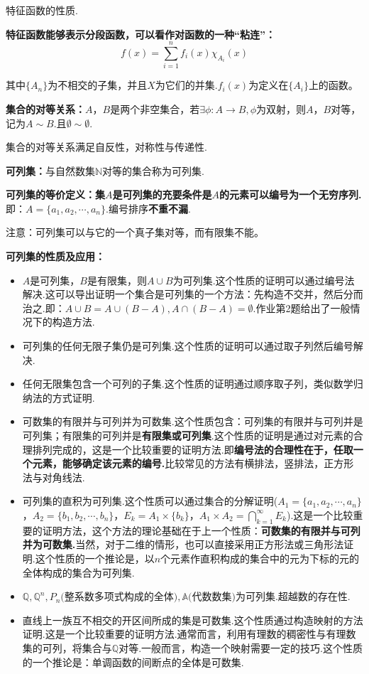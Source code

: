 \documentclass[bwprint, withoutpreface]{cumcmthesis}
\begin{document}
特征函数的性质.

\textbf{特征函数能够表示分段函数，可以看作对函数的一种“粘连”：}
\begin{equation*}
	f(x) = \sum_{i = 1}^{n}{f_i(x)\chi_{A_i}(x)}
\end{equation*}

其中$\{A_n\}$为不相交的子集，并且$X$为它们的并集.$f_i(x)$为定义在$\{A_i\}$上的函数。

\textbf{集合的对等关系：}$A$，$B$是两个非空集合，若$\exists \phi:A \to B, \phi\mbox{为双射}$，则$A$，$B$对等，记为$A \sim B$.且$\emptyset \sim \emptyset$.

集合的对等关系满足自反性，对称性与传递性.

\textbf{可列集：}与自然数集$\mathbb{N}$对等的集合称为可列集.

\textbf{可列集的等价定义：集$A$是可列集的充要条件是$A$的元素可以编号为一个无穷序列.}即：$A=\{a_1, a_2, \cdots, a_n\}$.编号排序\textbf{不重不漏}.

注意：可列集可以与它的一个真子集对等，而有限集不能。

\textbf{可列集的性质及应用：}

\begin{itemize}[itemindent=2em]
	\item $A$是可列集，$B$是有限集，则$A \cup B$为可列集.这个性质的证明可以通过编号法解决.这可以导出证明一个集合是可列集的一个方法：先构造不交并，然后分而治之.即：$A \cup B = A \cup (B - A), A \cap (B - A) = \emptyset$.作业第2题给出了一般情况下的构造方法.
	\item 可列集的任何无限子集仍是可列集.这个性质的证明可以通过取子列然后编号解决.
	\item 任何无限集包含一个可列的子集.这个性质的证明通过顺序取子列，类似数学归纳法的方式证明.
	\item 可数集的有限并与可列并为可数集.这个性质包含：可列集的有限并与可列并是可列集；有限集的可列并是\textbf{有限集或可列集}.这个性质的证明是通过对元素的合理排列完成的，这是一个比较重要的证明方法.即\textbf{编号法的合理性在于，任取一个元素，能够确定该元素的编号.}比较常见的方法有横排法，竖排法，正方形法与对角线法.
	\item 可列集的直积为可列集.这个性质可以通过集合的分解证明($A_1=\{a_1, a_2, \cdots, a_n\}$，$A_2=\{b_1, b_2, \cdots, b_n\}$，$E_k=A_1 \times \{b_k\}$，$A_1 \times A_2 = \bigcap_{k=1}^{\infty}{E_k}$).这是一个比较重要的证明方法，这个方法的理论基础在于上一个性质：\textbf{可数集的有限并与可列并为可数集.}当然，对于二维的情形，也可以直接采用正方形法或三角形法证明.这个性质的一个推论是，以$n$个元素作直积构成的集合中的元为下标的元的全体构成的集合为可列集.
	\item $\mathbb{Q}, \mathbb{Q}^n, P_n\mbox{(整系数多项式构成的全体)},\mathbb{A}\mbox{(代数数集)}$为可列集.超越数的存在性.
	\item 直线上一族互不相交的开区间所成的集是可数集.这个性质通过构造映射的方法证明.这是一个比较重要的证明方法.通常而言，利用有理数的稠密性与有理数集的可列，将集合与$\mathbb{Q}$对等.一般而言，构造一个映射需要一定的技巧.这个性质的一个推论是：单调函数的间断点的全体是可数集.
\end{itemize}
\end{document}
